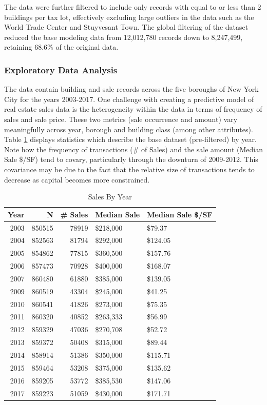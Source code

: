 \documentclass[conference,final,]{IEEEtran}
\begin{document}
The data were further filtered to include only records with equal to or
less than 2 buildings per tax lot, effectively excluding large outliers
in the data such as the World Trade Center and Stuyvesant Town. The
global filtering of the dataset reduced the base modeling data from
12,012,780 records down to 8,247,499, retaining 68.6\% of the original
data.

\hypertarget{exploratory-data-analysis}{%
\subsubsection{Exploratory Data
Analysis}\label{exploratory-data-analysis}}

The data contain building and sale records across the five boroughs of
New York City for the years 2003-2017. One challenge with creating a
predictive model of real estate sales data is the heterogeneity within
the data in terms of frequency of sales and sale price. These two
metrics (sale occurrence and amount) vary meaningfully across year,
borough and building class (among other attributes). Table
\ref{tab:by_year} displays statistics which describe the base dataset
(pre-filtered) by year. Note how the frequency of transactions (\# of
Sales) and the sale amount (Median Sale \$/SF) tend to covary,
particularly through the downturn of 2009-2012. This covariance may be
due to the fact that the relative size of transactions tends to decrease
as capital becomes more constrained.

\begin{table}

\caption{\label{tab:by_year}\label{tab:by_year} Sales By Year}
\centering
\begin{tabular}[t]{r|r|r|l|l}
\hline
Year & N & \# Sales & Median Sale & Median Sale \$/SF\\
\hline
2003 & 850515 & 78919 & \$218,000 & \$79.37\\
\hline
2004 & 852563 & 81794 & \$292,000 & \$124.05\\
\hline
2005 & 854862 & 77815 & \$360,500 & \$157.76\\
\hline
2006 & 857473 & 70928 & \$400,000 & \$168.07\\
\hline
2007 & 860480 & 61880 & \$385,000 & \$139.05\\
\hline
2009 & 860519 & 43304 & \$245,000 & \$41.25\\
\hline
2010 & 860541 & 41826 & \$273,000 & \$75.35\\
\hline
2011 & 860320 & 40852 & \$263,333 & \$56.99\\
\hline
2012 & 859329 & 47036 & \$270,708 & \$52.72\\
\hline
2013 & 859372 & 50408 & \$315,000 & \$89.44\\
\hline
2014 & 858914 & 51386 & \$350,000 & \$115.71\\
\hline
2015 & 859464 & 53208 & \$375,000 & \$135.62\\
\hline
2016 & 859205 & 53772 & \$385,530 & \$147.06\\
\hline
2017 & 859223 & 51059 & \$430,000 & \$171.71\\
\hline
\end{tabular}
\end{table}
\end{document}
